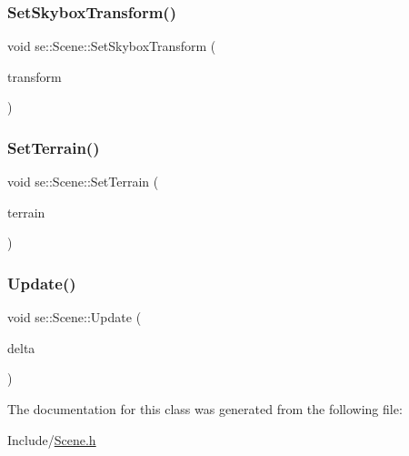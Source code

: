 \subsubsection{\texorpdfstring{Set\+Skybox\+Transform()}{SetSkyboxTransform()}}
{\footnotesize\ttfamily void se\+::\+Scene\+::\+Set\+Skybox\+Transform (\begin{DoxyParamCaption}\item[{\mbox{\hyperlink{classse_1_1_transform3f}{Transform3f}} $\ast$}]{transform }\end{DoxyParamCaption})}

\mbox{\label{classse_1_1_scene_ac8fddc56bc7f1385d640f24e75ea41d6}} 
\subsubsection{\texorpdfstring{Set\+Terrain()}{SetTerrain()}}
{\footnotesize\ttfamily void se\+::\+Scene\+::\+Set\+Terrain (\begin{DoxyParamCaption}\item[{\mbox{\hyperlink{classse_1_1_abstract_terrain}{Abstract\+Terrain}} $\ast$}]{terrain }\end{DoxyParamCaption})}

\mbox{\label{classse_1_1_scene_acdc3858f5d4fd76cf9a712a02218341a}} 
\subsubsection{\texorpdfstring{Update()}{Update()}}
{\footnotesize\ttfamily void se\+::\+Scene\+::\+Update (\begin{DoxyParamCaption}\item[{float}]{delta }\end{DoxyParamCaption})}



The documentation for this class was generated from the following file\+:\begin{DoxyCompactItemize}
\item 
Include/\mbox{\hyperlink{_scene_8h}{Scene.\+h}}\end{DoxyCompactItemize}
